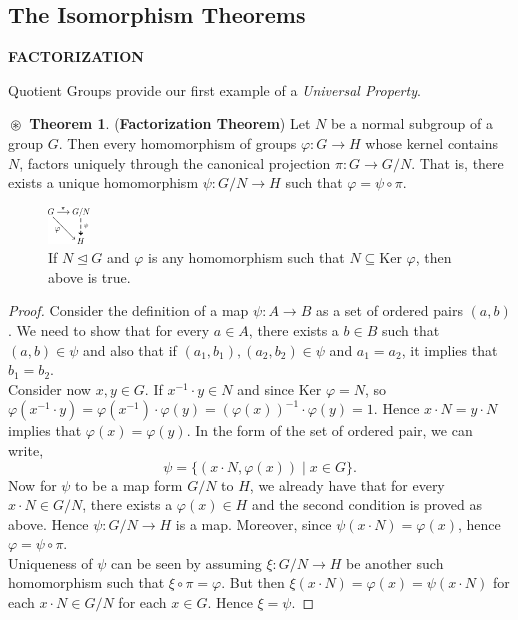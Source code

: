 \documentclass{article}
\theoremstyle{definition}
\newtheorem{theorem}{$\boxed{\boxed{\circledast}}$ Theorem}
\theoremstyle{remark}
\theoremstyle{definition}
\theoremstyle{definition}
\theoremstyle{definition}
\theoremstyle{proof}
\newcommand{\inv}[1]{#1^{-1}}
\newcommand{\kernel}[0]{\text{Ker }}
\newcommand{\nsg}[0]{\trianglelefteq}
\begin{document}
\subsection{The Isomorphism Theorems}
\hrulefill
\textbf{FACTORIZATION}
\hrulefill

Quotient Groups provide our first example of a \emph{Universal Property}.
\begin{theorem}
	(\textbf{Factorization Theorem}) Let $ N $ be a normal subgroup of a group $ G $. Then every homomorphism of groups $ \varphi : G\longrightarrow H $ whose kernel contains $ N $, factors uniquely through the canonical projection $ \pi : G\longrightarrow G/N $. That is, there exists a unique homomorphism $ \psi : G/N \longrightarrow H $ such that $ \varphi = \psi \circ \pi $.
\end{theorem}
\begin{figure}[h!]
	\begin{centering}
			\includegraphics[width = 0.1\textwidth]{UniqueFactorTheorem.pdf}
		\caption{If $ N\nsg G $ and $ \varphi $ is any homomorphism such that $ N\subseteq \kernel \varphi $, then above is true.}
	\end{centering}
\end{figure}
\begin{proof}
	Consider the definition of a map $ \psi : A \to B $ as a set of ordered pairs $ (a,b) $. We need to show that for every $ a\in A $, there exists a $ b\in B $ such that $ (a,b) \in \psi $ and also that if $ (a_1,b_1),(a_2,b_2)\in \psi $ and $ a_1 = a_2 $, it implies that $ b_1 = b_2 $.\\
	Consider now $ x,y \in G$. If $ \inv{x}\cdot y \in N $ and since $ \kernel\varphi = N $, so $ \varphi(\inv{x}\cdot y) = \varphi(\inv{x})\cdot \varphi(y) = \inv{(\varphi(x))}\cdot \varphi(y) = 1$. Hence $ x\cdot N = y\cdot N $ implies that $ \varphi(x) = \varphi(y) $. In the form of the set of ordered pair, we can write,
	\[ \psi = \{(x\cdot N, \varphi(x))\;\vert\; x\in G\}. \]
	Now for $ \psi $ to be a map form $ G/N $ to $ H $, we already have that for every $ x\cdot N \in G/N $, there exists a $ \varphi(x) \in H $ and the second condition is proved as above. Hence $ \psi : G/N \to H $ is a map. Moreover, since $ \psi (x\cdot N) = \varphi(x) $, hence $ \varphi = \psi \circ \pi $. \\
	Uniqueness of $ \psi $ can be seen by assuming $ \xi : G/N \to H $ be another such homomorphism such that $ \xi \circ \pi = \varphi $. But then $ \xi (x\cdot N) = \varphi(x) = \psi(x\cdot N) $ for each $ x\cdot N \in G/N $ for each $ x\in G $. Hence $ \xi = \psi $.
\end{proof}
\end{document}
